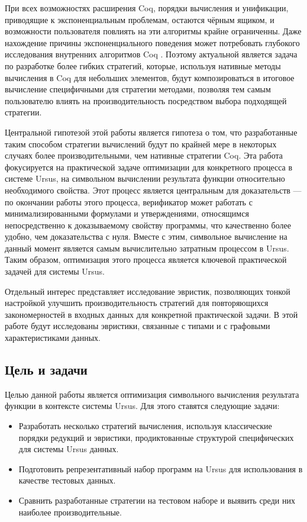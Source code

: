 \documentclass[../diploma.tex]{subfiles}
\begin{document}
При всех возможностях расширения Coq, порядки вычисления и унификации, приводящие к экспоненциальным проблемам, остаются чёрным ящиком, и возможности пользователя повлиять на эти алгоритмы крайне ограниченны. Даже нахождение причины экспоненциального поведения может потребовать глубокого исследования внутренних алгоритмов Coq \cite{gross_phd}. Поэтому актуальной является задача по разработке более гибких стратегий, которые, используя нативные методы вычисления в Coq для небольших элементов, будут композироваться в итоговое вычисление специфичными для стратегии методами, позволяя тем самым пользователю влиять на производительность посредством выбора подходящей стратегии.

Центральной гипотезой этой работы является гипотеза о том, что разработанные таким способом стратегии вычислений будут по крайней мере в некоторых случаях более производительными, чем нативные стратегии Coq. Эта работа фокусируется на практической задаче оптимизации для конкретного процесса в системе Ursus, на символьном вычислении результата функции относительно необходимого свойства. Этот процесс является центральным для доказательств --- по окончании работы этого процесса, верификатор может работать с минимализированными формулами и утверждениями, относящимся непосредственно к доказываемому свойству программы, что качественно более удобно, чем доказательства с нуля. Вместе с этим, символьное вычисление на данный момент является самым вычислительно затратным процессом в Ursus. Таким образом, оптимизация этого процесса является ключевой практической задачей для системы Ursus.

Отдельный интерес представляет исследование эвристик, позволяющих тонкой настройкой улучшить производительность стратегий для повторяющихся закономерностей в входных данных для конкретной практической задачи. В этой работе будут исследованы эвристики, связанные с типами и с графовыми характеристиками данных.

\subsection*{Цель и задачи}

Целью данной работы является оптимизация символьного вычисления результата функции в контексте системы Ursus. Для этого ставятся следующие задачи:

\begin{itemize}
	\item Разработать несколько стратегий вычисления, используя классические порядки редукций и эвристики, продиктованные структурой специфических для системы Ursus данных.
	\item Подготовить репрезентативный набор программ на Ursus для использования в качестве тестовых данных.
	\item Сравнить разработанные стратегии на тестовом наборе и выявить среди них наиболее производительные.
\end{itemize}
\end{document}
